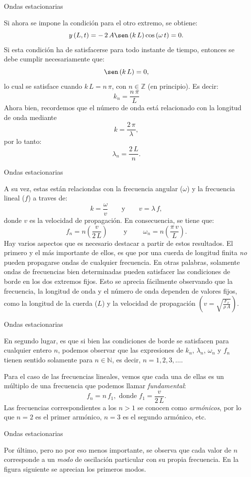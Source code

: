 \documentclass[11pt,handout,aspectratio=1610]{beamer}
\newcommand{\zz}{\mathbb{Z}}
\newcommand{\nn}{\mathbb{N}}
\newcommand{\vs}{\vspace{11pt}}
\begin{document}
\begin{frame}{Ondas estacionarias}   
    
    Si ahora se impone la condición para el otro extremo, se obtiene: $$ y \left(L,t\right) = - \, 2 \, A \sen \left(k \, L\right) \cos \left(\omega \, t\right) = 0. $$ Si esta condición ha de satisfacerse para todo instante de tiempo, entonces se debe cumplir necesariamente que: $$ \sen \left(k \, L\right) = 0, $$ lo cual se satisface cuando $ k \, L = n \, \pi $, con $ n \in \zz $ (en principio). Es decir: $$ k_n = \frac{n \, \pi}{L} $$  Ahora bien, recordemos que el número de onda está relacionado con la longitud de onda mediante $$ k = \frac{2 \, \pi}{\lambda}, $$ por lo tanto: $$ \lambda_n = \frac{2 \, L}{n}. $$
    
\end{frame}

\begin{frame}{Ondas estacionarias}

   A su vez, estas están relaciondas con la frecuencia angular ($\omega$) y la frecuencia lineal ($f$) a traves de: $$ k = \frac{\omega}{v} \qquad \text{y} \qquad v = \lambda \, f, $$ donde $v$ es la velocidad de propagación. En consecuencia, se tiene que: $$ f_n = n \left(\frac{v}{2 \, L}\right) \qquad \text{ y } \qquad \omega_n = n \left(\frac{\pi \, v}{L}\right). $$ Hay varios aspectos que es necesario destacar a partir de estos resultados. El primero y el más importante de ellos, es que por una cuerda de longitud finita \emph{no} pueden propagarse ondas de cualquier frecuencia. En otras palabras, solamente ondas de frecuencias bien determinadas pueden satisfacer las condiciones de borde en los dos extremos fijos. Esto se aprecia fácilmente observando que la frecuencia, la longitud de onda y el número de onda dependen de valores fijos, como la longitud de la cuerda ($L$) y la velocidad de propagación $\left(v = \sqrt{\frac{F_x}{\rho \, A}}\right)$.
    
\end{frame}

\begin{frame}{Ondas estacionarias}

    En segundo lugar, es que si bien las condiciones de borde se satisfacen para cualquier entero $n$, podemos observar que las expresiones de $k_n$, $\lambda_n$, $\omega_n$ y $f_n$ tienen sentido solamente para $n \in \nn $, es decir, $n = 1, 2, 3, \ldots$.

    \vs 

    Para el caso de las frecuencias lineales, vemos que cada una de ellas es un múltiplo de una frecuencia que podemos llamar \emph{fundamental}: $$ f_n = n \, f_1, \text{ donde } f_1 = \frac{v}{2 \, L}. $$ Las frecuencias correspondientes a los $n > 1$ se conocen como \emph{armónicos}, por lo que $n=2$ es el primer armónico, $n=3$ es el segundo armónico, etc.
    
\end{frame}

\begin{frame}{Ondas estacionarias}

    Por último, pero no por eso menos importante, se observa que cada valor de $n$ corresponde a un \emph{modo} de oscilación particular con su propia frecuencia. En la figura siguiente se aprecian los primeros modos.



\end{frame}
\end{document}
